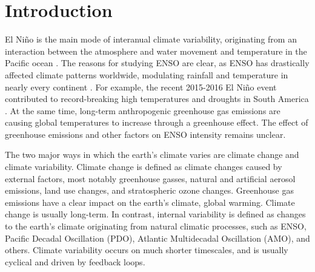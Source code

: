 \documentclass[draft]{agujournal2019}
\begin{document}

%
%
%
%


\section{Introduction}

El Ni\~{n}o is the main mode of interanual climate variability, originating from an interaction between the atmosphere and water movement and temperature in the Pacific ocean \cite{bjerknes1969atmospheric}. The reasons for studying ENSO are clear, as ENSO has drastically affected climate patterns worldwide, modulating rainfall and temperature in nearly every continent \cite{ropelewski1987global}. For example, the recent 2015-2016 El Ni\~{n}o event contributed to record-breaking high temperatures and droughts in South America \cite{jimenez2016record}. At the same time, long-term anthropogenic greenhouse gas emissions are causing global temperatures to increase through a greenhouse effect. The effect of greenhouse emissions and other factors on ENSO intensity remains unclear.

The two major ways in which the earth's climate varies are climate change and climate variability. Climate change is defined as climate changes caused by external factors, most notably greenhouse gasses, natural and artificial aerosol emissions, land use changes, and stratospheric ozone changes. Greenhouse gas emissions have a clear impact on the earth's climate, global warming. Climate change is usually long-term. In contrast, internal variability is defined as changes to the earth's climate originating from natural climatic processes, such as ENSO, Pacific Decadal Oscillation (PDO), Atlantic Multidecadal Oscillation (AMO), and others. Climate variability occurs on much shorter timescales, and is usually cyclical and driven by feedback loops.
\end{document}
